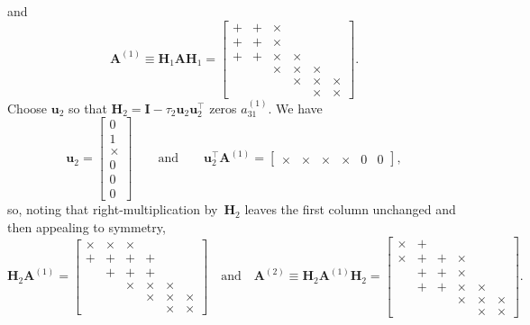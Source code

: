 \documentclass[12pt,a4paper]{article}
\begin{document}
and
\[
\boldsymbol{A}^{(1)}\equiv\boldsymbol{H}_1\boldsymbol{A}\boldsymbol{H}_1
      =\begin{bmatrix}
+&+&\times&      &      &      \\
+&+&\times&      &      &      \\
+&+&\times&\times&      &      \\
 & &\times&\times&\times&      \\
 & &      &\times&\times&\times\\
 & &      &      &\times&\times\end{bmatrix}.
\]
Choose $\boldsymbol{u}_2$ so that
$\boldsymbol{H}_2=\boldsymbol{I}-\tau_2\boldsymbol{u}_2\boldsymbol{u}_2^\top$
zeros $a^{(1)}_{31}$. We have
\[
\boldsymbol{u}_2=\begin{bmatrix}0\\ 1\\ \times\\ 0\\ 0\\ 0\end{bmatrix}
\qquad\text{and}\qquad
\boldsymbol{u}_2^\top\boldsymbol{A}^{(1)}
=\begin{bmatrix}\times&\times&\times&\times&0&0\end{bmatrix},
\]
so, noting that right-multiplication by~$\boldsymbol{H}_2$ leaves the first
column unchanged and then appealing to symmetry,
\[
\boldsymbol{H}_2\boldsymbol{A}^{(1)}
      =\begin{bmatrix}
\times&\times&\times&      &      &      \\
     +&     +&     +&     +&      &      \\
      &     +&     +&     +&      &      \\
      &      &\times&\times&\times&      \\
      &      &      &\times&\times&\times\\
      &      &      &      &\times&\times\end{bmatrix}
\quad\text{and}\quad
\boldsymbol{A}^{(2)}\equiv
\boldsymbol{H}_2\boldsymbol{A}^{(1)}\boldsymbol{H}_2
      =\begin{bmatrix}
\times&+&      &      &      &      \\
\times&+&     +&\times&      &      \\
      &+&     +&\times&      &      \\
      &+&     +&\times&\times&      \\
      & &      &\times&\times&\times\\
      & &      &      &\times&\times\end{bmatrix}.
\]
\end{document}
